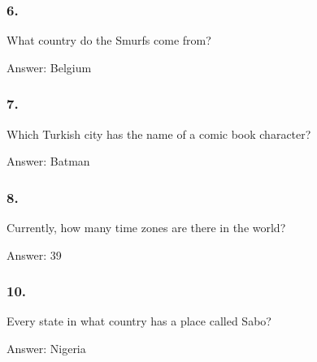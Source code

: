 \documentclass{beamer}
\begin{document}
    \begin{frame}
        \frametitle{6.}
        What country do the Smurfs come from?\\

        \begin{center}
            Answer: Belgium
        \end{center}
    \end{frame}

    \begin{frame}
        \frametitle{7.}
        Which Turkish city has the name of a comic book character?\\

        \begin{center}
            Answer: Batman
        \end{center}
    \end{frame}

    \begin{frame}
        \frametitle{8.}
        Currently, how many time zones are there in the world?\\

        \begin{center}
            Answer: 39
        \end{center}
    \end{frame}

    \begin{frame}
        \frametitle{10.}
        Every state in what country has a place called Sabo?\\

        \begin{center}
            Answer: Nigeria
        \end{center}
    \end{frame}
\end{document}
